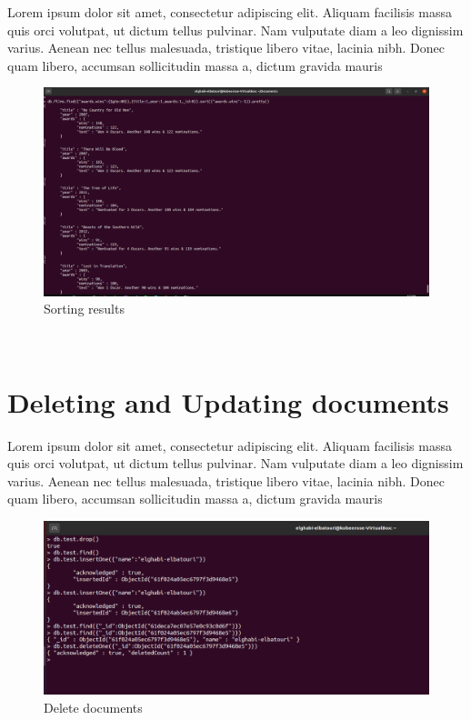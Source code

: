 \begin{spacing}{1.2}
\par Lorem ipsum dolor sit amet, consectetur adipiscing elit. Aliquam facilisis massa quis orci volutpat, ut dictum tellus pulvinar. Nam vulputate diam a leo dignissim varius. Aenean nec tellus malesuada, tristique libero vitae, lacinia nibh. Donec quam libero, accumsan sollicitudin massa a, dictum gravida mauris
\\
\begin{figure}[!htb] 
\begin{center} 
\includegraphics[width=1\linewidth]{Pictures/MongoDB/Examining MongoDB Query Features/Advanced search/Sorting results} 
\end{center} 
\caption{Sorting results} 
\end{figure}  \FloatBarrier
\\
\section{Deleting and Updating documents }
\par Lorem ipsum dolor sit amet, consectetur adipiscing elit. Aliquam facilisis massa quis orci volutpat, ut dictum tellus pulvinar. Nam vulputate diam a leo dignissim varius. Aenean nec tellus malesuada, tristique libero vitae, lacinia nibh. Donec quam libero, accumsan sollicitudin massa a, dictum gravida mauris
\\
\begin{figure}[!htb] 
\begin{center} 
\includegraphics[width=1\linewidth]{Pictures/MongoDB/Examining MongoDB Query Features/Deleting and Updating documents/Delete documents} 
\end{center} 
\caption{Delete documents} 
\end{figure}  \FloatBarrier
\\


\end{spacing}
